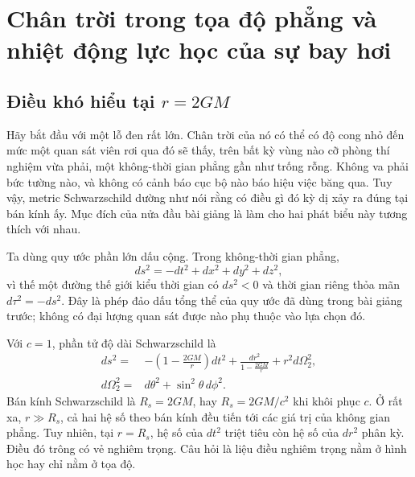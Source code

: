\chapter{Chân trời trong tọa độ phẳng và nhiệt động lực học của sự bay hơi}


\section{Điều khó hiểu tại \texorpdfstring{\(r=2GM\)}{r=2GM}}

Hãy bắt đầu với một lỗ đen rất lớn. Chân trời của nó có thể có độ cong nhỏ đến mức một quan sát viên rơi qua đó sẽ thấy, trên bất kỳ vùng nào cỡ phòng thí nghiệm vừa phải, một không-thời gian phẳng gần như trống rỗng. Không va phải bức tường nào, và không có cảnh báo cục bộ nào báo hiệu việc băng qua. Tuy vậy, metric Schwarzschild dường như nói rằng có điều gì đó kỳ dị xảy ra đúng tại bán kính ấy. Mục đích của nửa đầu bài giảng là làm cho hai phát biểu này tương thích với nhau.

Ta dùng quy ước phần lớn dấu cộng. Trong không-thời gian phẳng,
\begin{equation}
ds^2=-dt^2+dx^2+dy^2+dz^2,
\end{equation}
vì thế một đường thế giới kiểu thời gian có \(ds^2<0\) và thời gian riêng thỏa mãn \(d\tau^2=-ds^2\). Đây là phép đảo dấu tổng thể của quy ước đã dùng trong bài giảng trước; không có đại lượng quan sát được nào phụ thuộc vào lựa chọn đó.

Với \(c=1\), phần tử độ dài Schwarzschild là
\begin{equation}
\begin{aligned}
ds^2={}&-\left(1-\frac{2GM}{r}\right)dt^2
+\frac{dr^2}{1-\frac{2GM}{r}}
+r^2d\Omega_2^2,\\
d\Omega_2^2={}&d\theta^2+\sin^2\theta\,d\phi^2 .
\end{aligned}
\label{eq:l03-schwarzschild}
\end{equation}
Bán kính Schwarzschild là \(R_s=2GM\), hay \(R_s=2GM/c^2\) khi khôi phục \(c\). Ở rất xa, \(r\gg R_s\), cả hai hệ số theo bán kính đều tiến tới các giá trị của không gian phẳng. Tuy nhiên, tại \(r=R_s\), hệ số của \(dt^2\) triệt tiêu còn hệ số của \(dr^2\) phân kỳ. Điều đó trông có vẻ nghiêm trọng. Câu hỏi là liệu điều nghiêm trọng nằm ở hình học hay chỉ nằm ở tọa độ.

